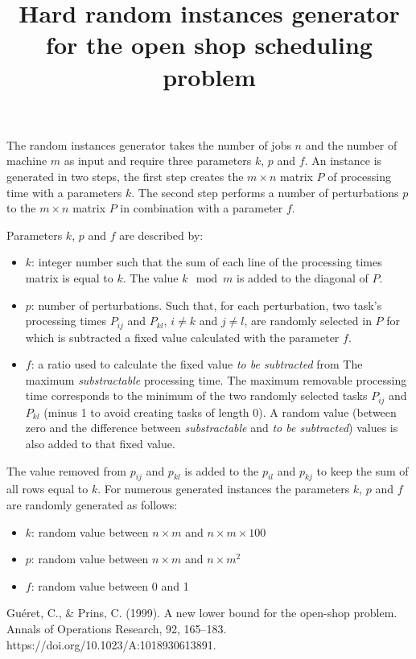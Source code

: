 \documentclass[fleqn,10pt]{article}
\title{Hard random instances generator for the open shop scheduling problem}   %
\begin{document}
\flushbottom
\maketitle
\thispagestyle{empty}

The random instances generator takes the number of jobs $n$ and the number of machine $m$ as input and require three parameters $k$, $p$ and $f$.
An instance is generated in two steps, the first step creates the $ m \times n $ matrix $P$ of processing time with a parameters $k$. The second step performs a number of perturbations $p$ to the $ m \times n $ matrix $P$ in combination with a parameter $f$.

Parameters $k$, $p$ and $f$ are described by:

\begin{itemize}
    \item $k$: integer number such that the sum of each line of the processing times matrix is equal to $k$. The value $k \mod m$ is added to the diagonal of $P$. 
    \item $p$: number of perturbations. Such that, for each perturbation, two task's processing times $P_{ij}$ and $ P_{kl}$, $i \neq k $ and $j \neq l$, are randomly selected in $P$ for which is subtracted a fixed value calculated with the parameter $f$.
    \item $f$: a ratio used to calculate the fixed value \textit{to be subtracted} from The maximum \textit{substractable} processing time. The maximum removable processing time corresponds to the minimum of the two randomly selected tasks $P_{ij}$ and $ P_{kl}$ (minus 1 to avoid creating tasks of length 0). A random value (between zero and the difference between \textit{substractable} and \textit{to be subtracted}) values is also added to that fixed value.
\end{itemize}

The value removed from $p_{ij}$ and $p_{kl}$ is added to the $p_{il}$ and $p_{kj}$ to keep the sum of all rows equal to $k$.
For numerous generated instances the parameters $k$, $p$ and $f$ are randomly generated as follows:

\begin{itemize}
    \item $k$: random value between $ n \times m$ and $n \times m \times 100 $
    \item $p$: random value between $ n \times m$ and $ n \times m^{2} $
    \item $f$: random value between 0 and 1
\end{itemize}


\begin{thebibliography}{1}
     Guéret, C., \& Prins, C. (1999). A new lower bound for the open-shop problem. Annals of Operations Research, 92, 165–183. https://doi.org/10.1023/A:1018930613891.

\end{thebibliography}
\end{document}
